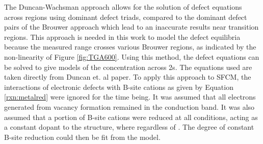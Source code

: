    The Duncan-Wachsman approach allows for the solution of defect equations across  regions using dominant defect triads, compared to the dominant defect pairs of the Brouwer approach which lead to an inaccurate results near transition regions.\cite{Duncan2007}
    This approach is needed in this work to model the defect equilibria because the measured  range crosses various Brouwer regions, as indicated by the non-linearity of Figure \ref{fig:TGA600}.
    Using this method, the defect equations can be solved to give models of the concentration across \po2s.
    The equations used are taken directly from Duncan et. al paper.
    To apply this approach to SFCM, the interactions of electronic defects with B-site cations as given by Equation \ref{rxn:metalred} were ignored for the time being.
    It was assumed that all electrons generated from vacancy formation remained in the conduction band.
    It was also assumed that a portion of B-site cations were reduced at all conditions, acting as a constant dopant to the structure, where regardless of .
    The degree of constant B-site reduction could then be fit from the model.


